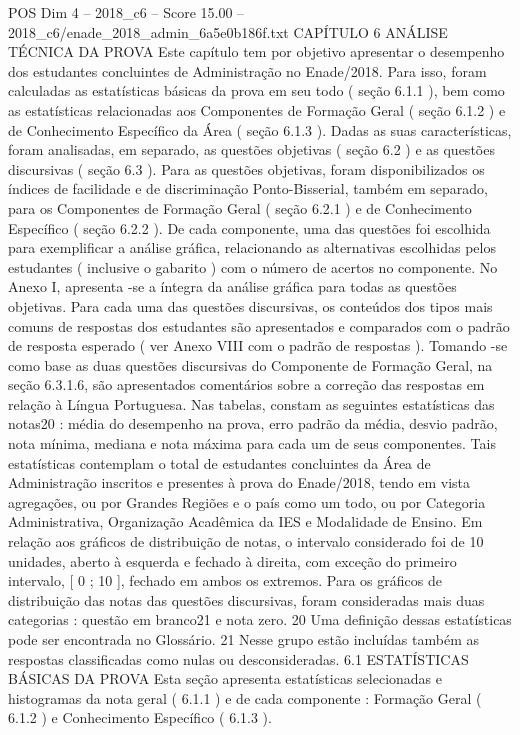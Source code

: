 \begin{textsample}{POS Dim 4 – 2018\_c6 – Score 15.00 – 2018\_c6/enade\_2018\_admin\_6a5e0b186f.txt}  \label{ex:f4_pos_003}
CAPÍTULO 6 ANÁLISE TÉCNICA DA PROVA Este capítulo tem por objetivo apresentar o desempenho dos estudantes concluintes de Administração no Enade/2018.
Para isso, foram calculadas as estatísticas básicas da prova em seu todo ( seção 6.1.1 ), bem como as estatísticas relacionadas aos Componentes de Formação Geral ( seção 6.1.2 ) e de Conhecimento Específico da Área ( seção 6.1.3 ).
Dadas as suas características, foram analisadas, em separado, as questões objetivas ( seção 6.2 ) e as questões discursivas ( seção 6.3 ).
Para as questões objetivas, foram disponibilizados os índices de facilidade e de discriminação Ponto-Bisserial, também em separado, para os Componentes de Formação Geral ( seção 6.2.1 ) e de Conhecimento Específico ( seção 6.2.2 ).
De cada componente, uma das questões foi escolhida para exemplificar a análise gráfica, relacionando as alternativas escolhidas pelos estudantes ( inclusive o gabarito ) com o número de acertos no componente.
No Anexo I, apresenta -se a íntegra da análise gráfica para todas as questões objetivas.
Para cada uma das questões discursivas, os conteúdos dos tipos mais comuns de respostas dos estudantes são apresentados e comparados com o padrão de resposta esperado ( ver Anexo VIII com o padrão de respostas ).
Tomando -se como base as duas questões discursivas do Componente de Formação Geral, na seção 6.3.1.6, são apresentados comentários sobre a correção das respostas em relação à Língua Portuguesa.
Nas tabelas, constam as seguintes estatísticas das notas20 : média do desempenho na prova, erro padrão da média, desvio padrão, nota mínima, mediana e nota máxima para cada um de seus componentes.
Tais estatísticas contemplam o total de estudantes concluintes da Área de Administração inscritos e presentes à prova do Enade/2018, tendo em vista agregações, ou por Grandes Regiões e o país como um todo, ou por Categoria Administrativa, Organização Acadêmica da IES e Modalidade de Ensino.
Em relação aos gráficos de distribuição de notas, o intervalo considerado foi de 10 unidades, aberto à esquerda e fechado à direita, com exceção do primeiro intervalo, [ 0 ; 10 ], fechado em ambos os extremos.
Para os gráficos de distribuição das notas das questões discursivas, foram consideradas mais duas categorias : questão em branco21 e nota zero. 20 Uma definição dessas estatísticas pode ser encontrada no Glossário. 21 Nesse grupo estão incluídas também as respostas classificadas como nulas ou desconsideradas. 6.1 ESTATÍSTICAS BÁSICAS DA PROVA Esta seção apresenta estatísticas selecionadas e histogramas da nota geral ( 6.1.1 ) e de cada componente : Formação Geral ( 6.1.2 ) e Conhecimento Específico ( 6.1.3 ).

\end{textsample}
